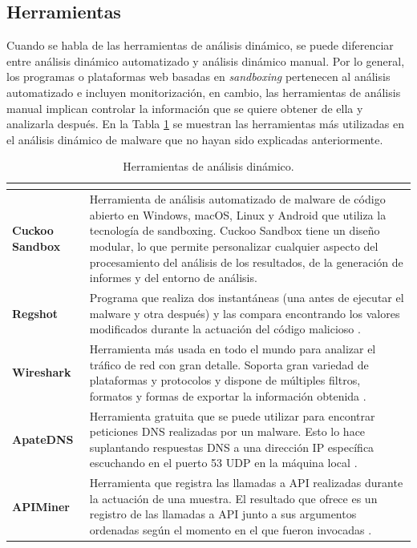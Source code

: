 \subsection{Herramientas}

\noindent Cuando se habla de las herramientas de análisis dinámico, se puede diferenciar entre análisis dinámico automatizado y análisis dinámico manual. Por lo general, los programas o plataformas web basadas en \textit{sandboxing} pertenecen al análisis automatizado e incluyen monitorización, en cambio, las herramientas de análisis manual implican controlar la información que se quiere obtener de ella y analizarla después. En la Tabla \ref{tab:toolsDin} se muestran las herramientas más utilizadas en el análisis dinámico de malware que no hayan sido explicadas anteriormente.

\begin{table}[htb!]
\centering
\scriptsize %
\caption{Herramientas de análisis dinámico.}
\begin{tabular}{|l|p{11.5cm}|}
\hline
\rowcolor[HTML]{C0C0C0}
\multicolumn{1}{|c|}{\cellcolor[HTML]{C0C0C0}{\textbf{Herramienta}}} & \multicolumn{1}{c|}{\cellcolor[HTML]{C0C0C0}{\textbf{Descripción}}}\\ \hline
\textbf{Cuckoo Sandbox}&Herramienta de análisis automatizado de malware de código abierto en Windows, macOS, Linux y Android que utiliza la tecnología de sandboxing. Cuckoo Sandbox tiene un diseño modular, lo que permite personalizar cualquier aspecto del procesamiento del análisis de los resultados, de la generación de informes y del entorno de análisis.\\ \hline
\textbf{Regshot}& Programa que realiza dos instantáneas (una antes de ejecutar el malware y otra después) y las compara encontrando los valores modificados durante la actuación del código malicioso \cite{PMA2012}.\\ \hline
    \textbf{Wireshark}&Herramienta más usada en todo el mundo para analizar el tráfico de red con gran detalle. Soporta gran variedad de plataformas y protocolos y dispone de múltiples filtros, formatos y formas de exportar la información obtenida \cite{WRSKDOC} \cite{92}.\\ \hline
    \textbf{ApateDNS}&Herramienta gratuita que se puede utilizar para encontrar peticiones \gls{DNS} realizadas por un malware. Esto lo hace suplantando respuestas \gls{DNS} a una dirección IP específica escuchando en el puerto 53 \gls{UDP} en la máquina local \cite{PMA2012}.\\ \hline
    \textbf{APIMiner}& Herramienta que registra las llamadas a \gls{API} realizadas durante la actuación de una muestra. El resultado que ofrece es un registro de las llamadas a \gls{API} junto a sus argumentos ordenadas según el momento en el que fueron invocadas \cite{Mohanta2020}.\\ \hline
\end{tabular}
\label{tab:toolsDin}
\end{table}

